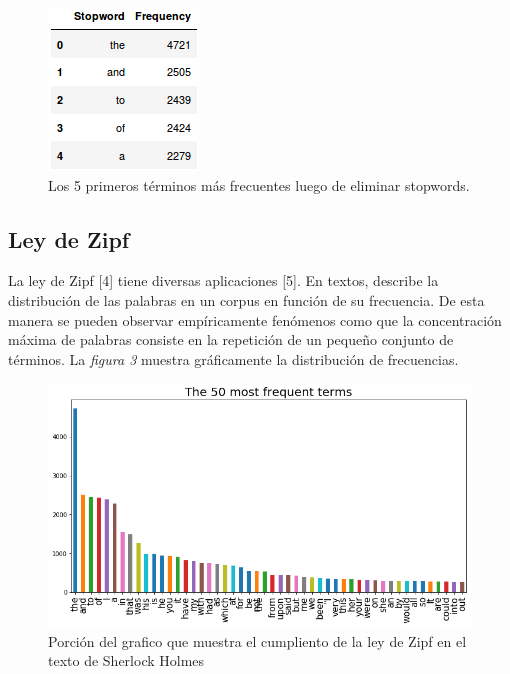 \documentclass[conference]{IEEEtran}
\begin{document}
\begin{figure}
\begin{center}
\includegraphics[scale=0.5]{img/3.png}
\end{center}
\caption{Los 5 primeros términos más frecuentes luego de eliminar stopwords.}
\end{figure}
\subsection{Ley de Zipf}
La ley de Zipf [4] tiene diversas aplicaciones [5]. En textos, describe la distribución de las palabras en un corpus en función de su frecuencia. De esta manera se pueden observar empíricamente fenómenos como que la concentración máxima de palabras consiste en la repetición de un pequeño conjunto de términos. La \textit{figura 3} muestra gráficamente la distribución de frecuencias.
\begin{figure}
\begin{center}
\includegraphics[scale=0.35]{img/4.png} 
\end{center}
\caption{Porción del grafico que muestra el cumpliento de la ley de Zipf en el texto de Sherlock Holmes}
\end{figure}
\end{document}
